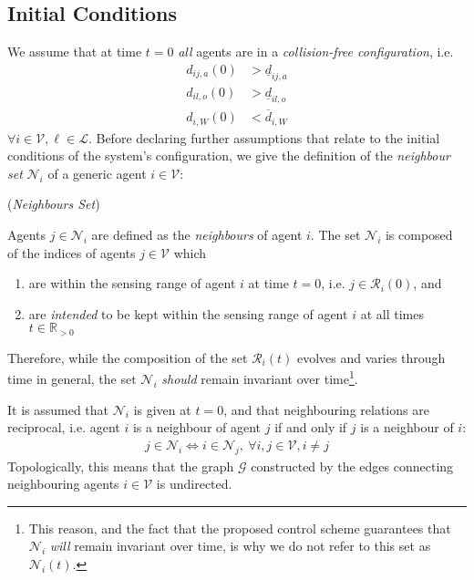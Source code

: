 \subsection{Initial Conditions}

We assume that at time $t=0$ \textit{all} agents are in a
\textit{collision-free configuration}, i.e.
\begin{subequations}
\begin{align}
    d_{ij,a}(0) &> \underline{d}_{ij,a} \\
    d_{il,o}(0) &> \underline{d}_{il,o} \\
    d_{i,W}(0)  &< \overline{d}_{i,W}
\label{eq:initially_coll_free}
\end{align}
\end{subequations}
$\forall i \in \mathcal{V}, \ell \in \mathcal{L}$. Before declaring further
assumptions that relate to the initial conditions of the system's configuration,
we give the definition of the \textit{neighbour set} $\mathcal{N}_i$ of a
generic agent $i \in \mathcal{V}$:
\begin{bw_box}
\begin{definition} (\textit{Neighbours Set})

Agents $j \in \mathcal{N}_i$ are defined as the \textit{neighbours} of
agent $i$. The set $\mathcal{N}_i$ is composed of the indices of agents
$j \in \mathcal{V}$ which
\begin{enumerate}
  \item are within the sensing range of agent $i$ at time $t=0$, i.e.
    $j \in \mathcal{R}_i(0)$, and
  \item are \textit{intended} to be kept within the sensing range of agent $i$ at all
    times $t \in \mathbb{R}_{> 0}$
\end{enumerate}
\end{definition}
\end{bw_box}

Therefore, while the composition of the set $\mathcal{R}_i(t)$ evolves and
varies through time in general, the set $\mathcal{N}_i$ \textit{should} remain
invariant over time\footnote{This reason, and the fact that the proposed
control scheme guarantees that $\mathcal{N}_i$ \textit{will} remain invariant
over time, is why we do not refer to this set as $\mathcal{N}_i(t)$.}.

It is assumed that $\mathcal{N}_i$ is given at $t=0$, and that neighbouring
relations are reciprocal, i.e. agent $i$ is a neighbour of agent $j$ if and
only if $j$ is a neighbour of $i$:
\begin{subequations}
\begin{align}
  j \in \mathcal{N}_i \Leftrightarrow i \in \mathcal{N}_j,\ \forall i,j \in \mathcal{V}, i\not=j
\end{align}
\end{subequations}
Topologically, this means that the graph $\mathcal{G}$ constructed by the edges
connecting neighbouring agents $i \in \mathcal{V}$ is undirected.

